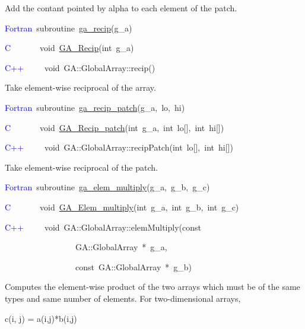 Add the contant pointed by alpha to each element of the patch. 
\begin{lyxcode}
\textcolor{blue}{Fortran~}subroutine~\href{http://www.emsl.pnl.gov/docs/global/ga_ops.html\#ga_recip}{ga\_{}recip}(g\_a)

\textcolor{blue}{C}~~~~~~~void~\href{http://www.emsl.pnl.gov/docs/global/c_nga_ops.html\#ga_recip}{GA\_{}Recip}(int~g\_a)

\textcolor{blue}{C++}~~~~~void~GA::GlobalArray::recip()
\end{lyxcode}
Take element-wise reciprocal of the array.
\begin{lyxcode}
\textcolor{blue}{Fortran}~subroutine~\href{http://www.emsl.pnl.gov/docs/global/ga_ops.html\#ga_recip_patch}{ga\_{}recip\_{}patch}(g\_a,~lo,~hi)~

\textcolor{blue}{C}~~~~~~~void~\href{http://www.emsl.pnl.gov/docs/global/c_nga_ops.html\#ga_recip_patch}{GA\_{}Recip\_{}patch}(int~g\_a,~int~lo{[}{]},~int~hi{[}{]})

\textcolor{blue}{C++~}~~~~void~GA::GlobalArray::recipPatch(int~lo{[}{]},~int~hi{[}{]})
\end{lyxcode}
Take element-wise reciprocal of the patch.
\begin{lyxcode}
\textcolor{blue}{Fortran}~subroutine~\href{http://www.emsl.pnl.gov/docs/global/ga_ops.html\#ga_elem_multiply}{ga\_{}elem\_{}multiply}(g\_a,~g\_b,~g\_c)

\textcolor{blue}{C}~~~~~~~void~\href{http://www.emsl.pnl.gov/docs/global/c_nga_ops.html\#ga_elem_multiply}{GA\_{}Elem\_{}multiply}(int~g\_a,~int~g\_b,~int~g\_c)~

\textcolor{blue}{C++}~~~~~void~GA::GlobalArray::elemMultiply(const~

~~~~~~~~~~~~~~~~~GA::GlobalArray~{*}~g\_a,~

~~~~~~~~~~~~~~~~~const~GA::GlobalArray~{*}~g\_b)
\end{lyxcode}
Computes the element-wise product of the two arrays which must be
of the same types and same number of elements. For two-dimensional
arrays,

c(i, j) = a(i,j){*}b(i,j)


